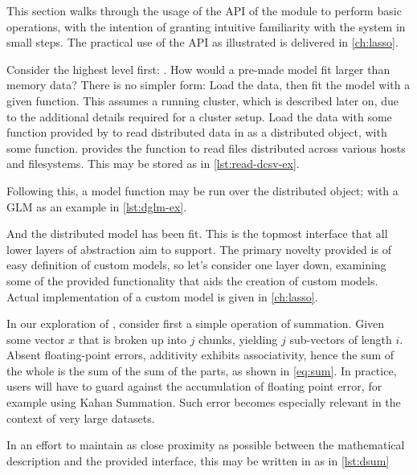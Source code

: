 This section walks through the usage of the API of the \lso{} module to perform basic operations, with the intention of granting intuitive familiarity with the system in small steps.
The practical use of the API as illustrated is delivered in \cref{ch:lasso}.

Consider the highest level first: \lsm{}.
How would a pre-made model fit larger than memory data?
There is no simpler form: Load the data, then fit the model with a given function.
This assumes a running cluster, which is described later on, due to the additional details required for a cluster setup.
Load the data with some function provided by \lso{} to read distributed data in as a distributed object, with some  function.
\lso{} provides the  function to read  files distributed across various hosts and filesystems.
This may be stored as in \cref{lst:read-dcsv-ex}.


Following this, a model function may be run over the distributed object; with a GLM as an example in \cref{lst:dglm-ex}.


And the distributed model has been fit.
This is the topmost interface that all lower layers of abstraction aim to support.
The primary novelty provided is of easy definition of custom models, so let's consider one layer down, examining some of the provided functionality that aids the creation of custom models.
Actual implementation of a custom model is given in \cref{ch:lasso}.

In our exploration of \lso{}, consider first a simple operation of summation.
Given some vector $x$ that is broken up into $j$ chunks, yielding $j$ sub-vectors of length $i$.
Absent floating-point errors, additivity exhibits associativity, hence the sum of the whole is the sum of the sum of the parts, as shown in \cref{eq:sum}.
In practice, users will have to guard against the accumulation of floating point error, for example using Kahan Summation\cite{kahan1965error}.
Such error becomes especially relevant in the context of very large datasets.


In an effort to maintain as close proximity as possible between the mathematical description and the provided interface, this may be written in \lso{} as in \cref{lst:dsum}


